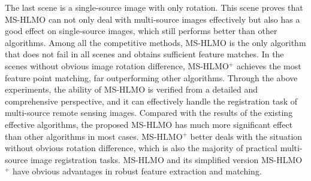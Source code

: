 The last scene is a single-source image with only rotation. This scene proves that MS-HLMO can not only deal with multi-source images effectively but also has a good effect on single-source images, which still performs better than other algorithms. Among all the competitive methods, MS-HLMO is the only algorithm that does not fail in all scenes and obtains sufficient feature matches. In the scenes without obvious image rotation difference, MS-HLMO$^+$ achieves the most feature point matching, far outperforming other algorithms. Through the above experiments, the ability of MS-HLMO is verified from a detailed and comprehensive perspective, and it can effectively handle the registration task of multi-source remote sensing images. Compared with the results of the existing effective algorithms, the proposed MS-HLMO has much more significant effect than other algorithms in most cases. MS-HLMO$^+$ better deals with the situation without obvious rotation difference, which is also the majority of practical multi-source image registration tasks. MS-HLMO and its simplified version MS-HLMO$^+$ have obvious advantages in robust feature extraction and matching.





